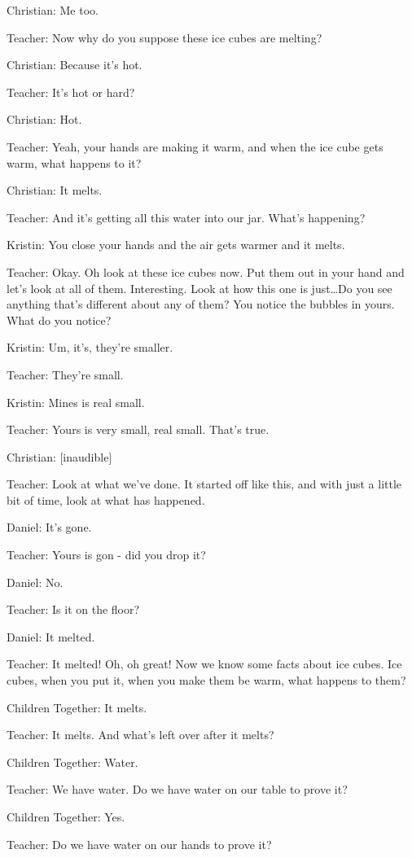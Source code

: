 Christian: Me too.

Teacher: Now why do you suppose these ice cubes are melting?

Christian: Because it's hot.

Teacher: It's hot or hard?

Christian: Hot.

Teacher: Yeah, your hands are making it warm, and when the ice cube gets warm, what happens to it?

Christian: It melts.

Teacher: And it's getting all this water into our jar. What's happening?

Kristin: You close your hands and the air gets warmer and it melts.

Teacher: Okay. Oh look at these ice cubes now. Put them out in your hand and let's look at all of them. Interesting. Look at how this one is just\dots Do you see anything that's different about any of them? You notice the bubbles in yours. What do you notice?

Kristin: Um, it's, they're smaller.

Teacher: They're small.

Kristin: Mines is real small.

Teacher: Yours is very small, real small. That's true.

Christian: [inaudible]

Teacher: Look at what we've done. It started off like this, and with just a little bit of time, look at what has happened.

Daniel: It's gone.

Teacher: Yours is gon - did you drop it?

Daniel: No.

Teacher: Is it on the floor?

Daniel: It melted.

Teacher: It melted! Oh, oh great! Now we know some facts about ice cubes. Ice cubes, when you put it, when you make them be warm, what happens to them?

Children Together: It melts.

Teacher: It melts. And what's left over after it melts?

Children Together: Water.

Teacher: We have water. Do we have water on our table to prove it?

Children Together: Yes.

Teacher: Do we have water on our hands to prove it?

